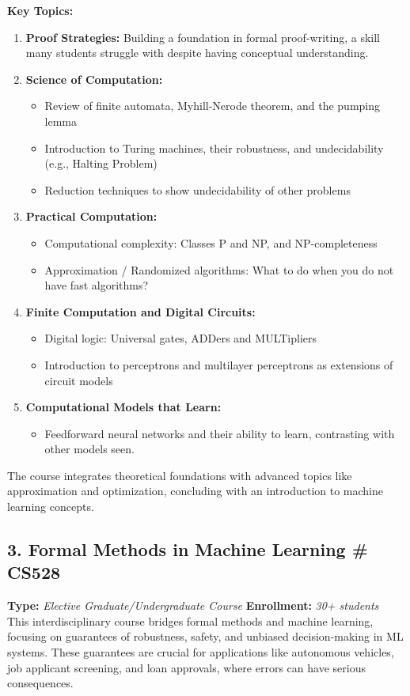\documentclass[11pt,a4paper,sans]{moderncv} %
\begin{document}
\textbf{Key Topics:}
\begin{enumerate}
    \item \textbf{Proof Strategies:} Building a foundation in formal proof-writing, a skill many students struggle with despite having conceptual understanding.
    \item \textbf{Science of Computation:}
    \begin{itemize}
        \item Review of finite automata, Myhill-Nerode theorem, and the pumping lemma
        \item Introduction to Turing machines, their robustness, and undecidability (e.g., Halting Problem)
        \item Reduction techniques to show undecidability of other problems
    \end{itemize}
    \item \textbf{Practical Computation:}
    \begin{itemize}
        \item Computational complexity: Classes P and NP, and NP-completeness
        \item Approximation / Randomized algorithms: What to do when you do not have fast algorithms?
    \end{itemize}
    \item \textbf{Finite Computation and Digital Circuits:}
    \begin{itemize}
        \item Digital logic: Universal gates, ADDers and MULTipliers
        \item Introduction to perceptrons and multilayer perceptrons as extensions of circuit models
    \end{itemize}
    \item \textbf{Computational Models that Learn:}
    \begin{itemize}
        \item Feedforward neural networks and their ability to learn, contrasting with other models seen.
    \end{itemize}
\end{enumerate}

The course integrates theoretical foundations with advanced topics like approximation and optimization, concluding with an introduction to machine learning concepts.

\newpage
\subsection*{3. Formal Methods in Machine Learning \null\hfill \# CS528}
\textbf{Type:} \emph{Elective Graduate/Undergraduate Course} \null\hfill \textbf{Enrollment:} \emph{30+ students} \\
This interdisciplinary course bridges formal methods and machine learning, focusing on guarantees of robustness, safety, and unbiased decision-making in ML systems. These guarantees are crucial for applications like autonomous vehicles, job applicant screening, and loan approvals, where errors can have serious consequences.
\end{document}
